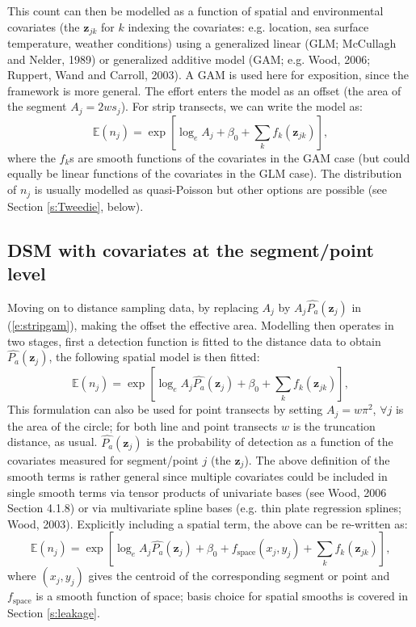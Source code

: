 \documentclass[useAMS,referee]{biom}
\begin{document}
This count can then be modelled as a function of spatial and environmental covariates (the $\mathbf{z}_{jk}$ for $k$ indexing the covariates: e.g. location, sea surface temperature, weather conditions) using a generalized linear (GLM; McCullagh and Nelder, 1989) or generalized additive model (GAM; e.g. Wood, 2006; Ruppert, Wand and Carroll, 2003). A GAM is used here for exposition, since the framework is more general. The effort enters the model as an offset (the area of the segment $A_j = 2ws_j$). For strip transects, we can write the model as:
\begin{equation}
\mathbb{E}(n_j) = \exp\left[ \log_e A_j + \beta_0 + \sum_k f_k\left(\bm{z}_{jk}\right) \right],
\label{e:stripgam}
\end{equation}
where the $f_k$s are smooth functions of the covariates in the GAM case (but could equally be linear functions of the covariates in the GLM case). The distribution of $n_j$ is usually modelled as quasi-Poisson but other options are possible (see Section \ref{s:Tweedie}, below).

\subsection{DSM with covariates at the segment/point level}

Moving on to distance sampling data, by replacing $A_j$ by $A_j\hat{P_a}(\mathbf{z}_j)$ in (\ref{e:stripgam}), making the offset the effective area. Modelling then operates in two stages, first a detection function is fitted to the distance data to obtain $\hat{P_a}(\mathbf{z}_j)$, the following spatial model is then fitted:
\begin{equation}
\mathbb{E}(n_j) = \exp\left[ \log_e A_j\hat{P_a}(\mathbf{z}_j) + \beta_0 + \sum_k f_k\left(\bm{z}_{jk}\right) \right],
\label{e:gamn}
\end{equation}
This formulation can also be used for point transects by setting $A_j=w\pi^2$, $\forall j$ is the area of the circle; for both line and point transects $w$ is the truncation distance, as usual. $\hat{P_a}(\mathbf{z}_j)$ is the probability of detection as a function of the covariates measured for segment/point $j$ (the $\mathbf{z}_j$). The above definition of the smooth terms is rather general since multiple covariates could be included in single smooth terms via tensor products of univariate bases (see Wood, 2006 Section 4.1.8) or via multivariate spline bases (e.g. thin plate regression splines; Wood, 2003). Explicitly including a spatial term, the above can be re-written as:
\begin{equation*}
\mathbb{E}(n_j) = \exp\left[ \log_e A_j \hat{P_a}(\mathbf{z}_j) + \beta_0 + f_\text{space}\left(x_j,y_j\right) + \sum_k f_k \left(\bm{z}_{jk}\right) \right],
\end{equation*}
where $(x_j,y_j)$ gives the centroid of the corresponding segment or point and $f_\text{space}$ is a smooth function of space; basis choice for spatial smooths is covered in Section \ref{s:leakage}.
\end{document}
